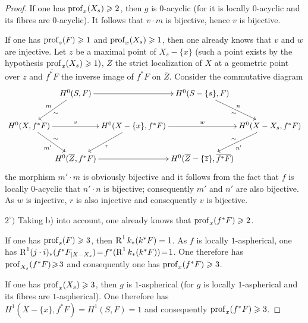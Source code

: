 \begin{proof}
If one has $\operatorname{prof}_x(X_s)\geqslant 2$, then $g$ is $0$-acyclic (for it is locally $0$-acyclic and its fibres are $0$-acyclic). It follows that $v\cdot m$ is bijective, hence $v$ is bijective.

If one has $\operatorname{prof}_s(F)\geqslant 1$ and $\operatorname{prof}_x(X_s)\geqslant 1$, then one already knows that $v$ and $w$ are injective. Let $z$ be a maximal point of $X_s-\{x\}$ (such a point exists by the hypothesis $\operatorname{prof}_x(X_s)\geqslant 1)$, $\bar Z$ the strict localization of $X$ at a geometric point over $z$ and $\overline{f^*F}$ the inverse image of $f^*F$ on $\bar Z$. Consider the commutative diagram
\begin{equation*}
\xymatrix@C=0mm{
&H^0(S, F)\ar[rr]\ar[ld]_{m}^{\sim}&&H^0(S-\{s\}, F)\ar[rd]_{\sim}^{n}\\
H^0(X, f^*F)\ar[rr]^-{v}\ar[rd]_{m'}^{\sim}&&H^0(X-\{x\}, f^*F)\ar[rr]^-{w}\ar[ld]^r&& H^0(X-X_s, f^*F)\ar[ld]^{n'}_{\sim}\\
&H^0(\bar Z, f^*F)\ar[rr]&&H^0(\bar Z-\{\bar z\}, \overline{f^*F})}
\end{equation*}
the morphism $m'\cdot m$ is obviously bijective and it follows from the fact that $f$ is locally $0$-acyclic that $n'\cdot n$ is bijective; consequently $m'$ and $n'$ are also bijective. As $w$ is injective, $r$ is also injective and consequently $v$ is bijective.

$2^\circ)$ Taking b) into account, one already knows that $\operatorname{prof}_x(f^*F)\geqslant 2$.

If one has $\operatorname{prof}_s(F)\geqslant 3$, then $\operatorname{R}^1k_*(k^*F)=1$. As $f$ is locally $1$-aspherical, one has $\operatorname{R}^1(j\cdot i)_*(f^*F_{|X-X_s})\!=\!f^*(\operatorname{R}^1k_*(k^*F))\!=\!1$. One therefore has \hbox{$\operatorname{prof}_{X_s}(f^*F)\!\geqslant\! 3$} and consequently one has $\operatorname{prof}_x(f^*F)\geqslant 3$.

If one has $\operatorname{prof}_x(X_s)\geqslant 3$, then $g$ is $1$-aspherical (for $g$ is locally $1$-aspherical and its fibres are $1$-aspherical). One therefore has $H^1(X-\{x\}, f^*F)=H^1(S, F)=1$ and consequently $\operatorname{prof}_x(f^*F)\geqslant 3$.


\end{proof}
